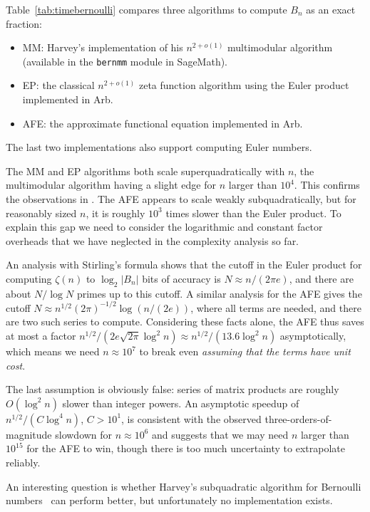 \documentclass[reqno]{amsart}
\theoremstyle{definition}
\begin{document}
Table~\ref{tab:timebernoulli}
compares three algorithms to compute $B_n$ as an exact fraction:
\begin{itemize}
\item MM: Harvey's implementation of his $n^{2+o(1)}$ multimodular algorithm~\cite{Harvey2010}
(available in the \texttt{bernmm} module in SageMath).
\item EP: the classical $n^{2+o(1)}$ zeta function algorithm
using the Euler product implemented in Arb.
\item AFE: the approximate functional equation implemented in Arb.
\end{itemize}

The last two implementations also support computing Euler numbers.

The MM and EP algorithms both scale
superquadratically with $n$, the multimodular algorithm having a slight edge for $n$ larger
than $10^4$.
This confirms the observations in \cite[Table~1]{Harvey2010}.
The AFE appears to scale weakly subquadratically, but for reasonably sized $n$,
it is roughly $10^3$ times slower than the Euler product.
To explain this gap we need to consider the logarithmic
and constant factor overheads that we have neglected
in the complexity analysis so far.

An analysis with Stirling's formula shows that the cutoff in the Euler product for computing $\zeta(n)$ to $\log_2 |B_n|$ bits of accuracy is $N \approx n / (2 \pi e)$,
and there are about $N / \log N$ primes up to this cutoff.
A similar analysis for the AFE gives the cutoff $N \approx n^{1/2} (2 \pi)^{-1/2} \log(n/(2 e))$, where all terms are needed, and there are two such series to compute.
Considering these facts alone, the AFE thus saves at most a factor $n^{1/2} / (2 e \sqrt{2 \pi} \log^2 n) \approx n^{1/2} / (13.6 \log^2 n)$ asymptotically,
which means we need $n \approx 10^7$ to break even \emph{assuming that the terms have unit cost}.

The last assumption is obviously false: series of matrix products are roughly $O(\log^2 n)$
slower than integer powers. An asymptotic speedup of $n^{1/2} / (C \log^4 n)$, $C > 10^1$,
is consistent with the observed three-orders-of-magnitude slowdown for $n \approx 10^6$
and suggests that we may need $n$ larger than $10^{15}$ for the AFE to win, though
there is too much uncertainty to extrapolate reliably.

An interesting question is whether Harvey's subquadratic algorithm for Bernoulli numbers~\cite{Harvey2014}
can perform better, but unfortunately no implementation exists.
\end{document}
